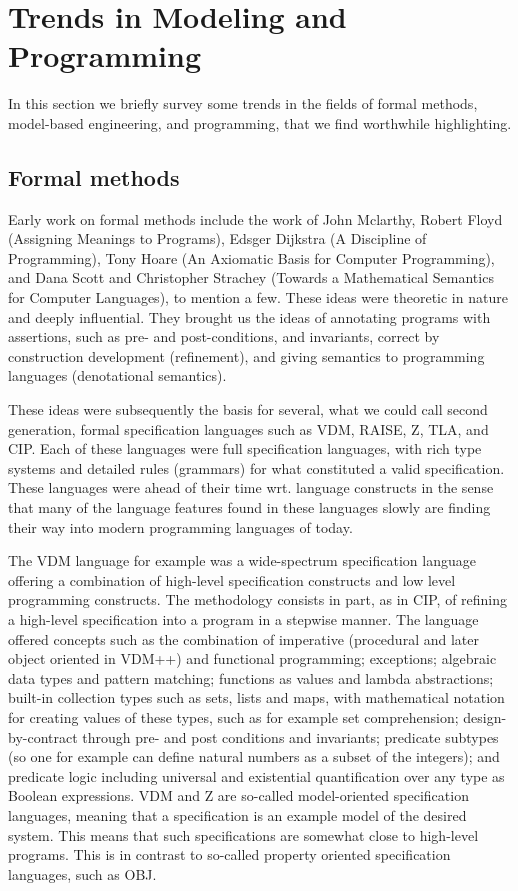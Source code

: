 
\section{Trends in Modeling and Programming}
\label{sec:trends}

In this section we briefly survey some trends in the fields of
formal methods, model-based engineering, and programming, that we find worthwhile highlighting.


\subsection{Formal methods}

Early work on formal methods include the work of John Mclarthy, 
Robert Floyd (Assigning Meanings to Programs), Edsger Dijkstra (A 
Discipline of Programming), Tony Hoare (An Axiomatic Basis for 
Computer Programming), and Dana Scott and Christopher Strachey 
(Towards a Mathematical Semantics for Computer Languages), to 
mention a few. These ideas were theoretic in nature and deeply 
influential. They brought us the ideas of  annotating programs with 
assertions, such as pre- and post-conditions, and invariants, 
correct by construction development (refinement), and giving 
semantics to programming languages (denotational semantics). 

These ideas were subsequently the basis for several, what we could 
call second generation, formal specification languages such as VDM, 
RAISE, Z, TLA, and CIP. Each of these languages were full 
specification languages, with rich type systems and detailed rules 
(grammars) for what constituted a valid specification. These 
languages were ahead of their time wrt. language constructs in the 
sense that many of the language features found in these languages 
slowly are finding their way into modern programming languages of 
today. 

The VDM language for example was a wide-spectrum specification 
language offering a combination of high-level specification 
constructs and low level programming constructs. The methodology 
consists in part, as in CIP, of refining a high-level specification 
into a program in a stepwise manner. The language offered concepts 
such as the combination of imperative (procedural and later object 
oriented in VDM++) and functional programming; exceptions; 
algebraic data types and pattern matching; functions as values and 
lambda abstractions; built-in collection types such as sets, lists 
and maps, with mathematical notation for creating values of these 
types, such as for example set comprehension; design-by-contract 
through pre- and post conditions and invariants; predicate subtypes 
(so one for example can define natural numbers as a subset of the 
integers);  and predicate logic including universal and existential 
quantification over any type as Boolean expressions.  VDM and Z are 
so-called model-oriented specification languages, meaning that a 
specification is an example model of the desired system. This means 
that such specifications are somewhat close to high-level programs. 
This is in contrast to so-called property oriented specification 
languages, such as OBJ.  

